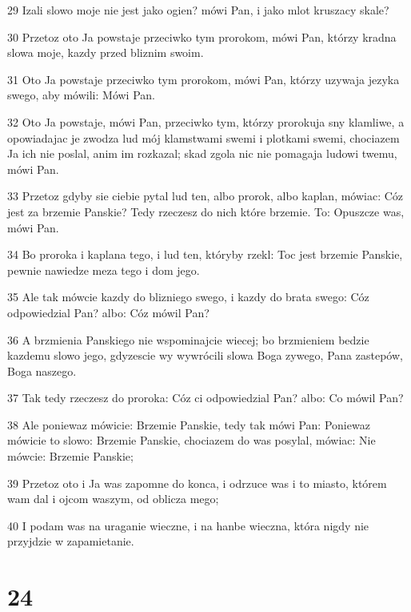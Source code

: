 \par 29 Izali slowo moje nie jest jako ogien? mówi Pan, i jako mlot kruszacy skale?
\par 30 Przetoz oto Ja powstaje przeciwko tym prorokom, mówi Pan, którzy kradna slowa moje, kazdy przed bliznim swoim.
\par 31 Oto Ja powstaje przeciwko tym prorokom, mówi Pan, którzy uzywaja jezyka swego, aby mówili: Mówi Pan.
\par 32 Oto Ja powstaje, mówi Pan, przeciwko tym, którzy prorokuja sny klamliwe, a opowiadajac je zwodza lud mój klamstwami swemi i plotkami swemi, chociazem Ja ich nie poslal, anim im rozkazal; skad zgola nic nie pomagaja ludowi twemu, mówi Pan.
\par 33 Przetoz gdyby sie ciebie pytal lud ten, albo prorok, albo kaplan, mówiac: Cóz jest za brzemie Panskie? Tedy rzeczesz do nich które brzemie. To: Opuszcze was, mówi Pan.
\par 34 Bo proroka i kaplana tego, i lud ten, któryby rzekl: Toc jest brzemie Panskie, pewnie nawiedze meza tego i dom jego.
\par 35 Ale tak mówcie kazdy do blizniego swego, i kazdy do brata swego: Cóz odpowiedzial Pan? albo: Cóz mówil Pan?
\par 36 A brzmienia Panskiego nie wspominajcie wiecej; bo brzmieniem bedzie kazdemu slowo jego, gdyzescie wy wywrócili slowa Boga zywego, Pana zastepów, Boga naszego.
\par 37 Tak tedy rzeczesz do proroka: Cóz ci odpowiedzial Pan? albo: Co mówil Pan?
\par 38 Ale poniewaz mówicie: Brzemie Panskie, tedy tak mówi Pan: Poniewaz mówicie to slowo: Brzemie Panskie, chociazem do was posylal, mówiac: Nie mówcie: Brzemie Panskie;
\par 39 Przetoz oto i Ja was zapomne do konca, i odrzuce was i to miasto, którem wam dal i ojcom waszym, od oblicza mego;
\par 40 I podam was na uraganie wieczne, i na hanbe wieczna, która nigdy nie przyjdzie w zapamietanie.

\chapter{24}


